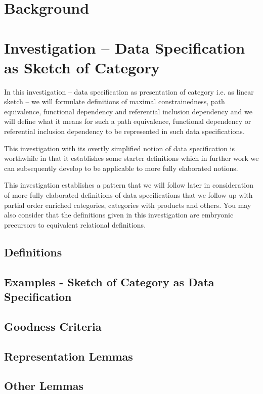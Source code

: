 \documentclass[10pt,a4paper]{article}
\theoremstyle{remark}
\begin{document}
\section{Background}


\section{Investigation -- Data Specification as Sketch of Category}
\note
In this investigation -- data specification as presentation of category i.e. as linear sketch \cite{BarrandWells}-- we will formulate 
definitions of maximal constrainedness, path equivalence, functional dependency and referential inclusion dependency
and we will define what it means for such a path equivalence, functional dependency or  referential inclusion dependency to be represented in such data specifications.

\note
This investigation with its overtly simplified notion of data specification is worthwhile in that   it establishes some starter definitions which in further work we can subsequently develop to be applicable to more fully elaborated notions.

\note 
This investigation establishes a pattern that we will follow later in consideration of more fully elaborated 
definitions of 
data specifications that we follow up with -- partial order enriched categories, categories with products and others. 
You may also consider that the definitions given in this investigation are embryonic precursors to equivalent relational definitions.


\subsection{Definitions}



\subsection{Examples - Sketch of Category as Data Specification}

\subsection{Goodness Criteria}

\subsection{Representation Lemmas}

\subsection{Other Lemmas}


 

\end{document}
